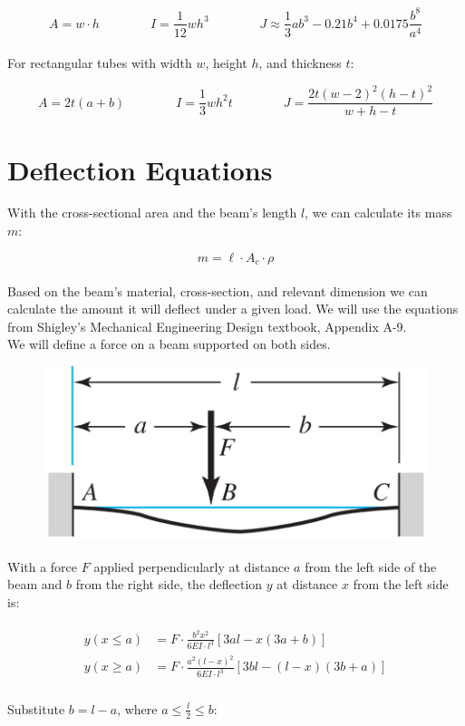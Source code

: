 \documentclass[a4paper]{article}
\begin{document}
	\begin{equation}
		A = w \cdot h \qquad\qquad
		I = \frac{1}{12} w h^3 \qquad\qquad
		J \approx \frac{1}{3} a b^3 - 0.21 b^4 + 0.0175 \frac{b^8}{a^4}
	\end{equation}
	\\
	For rectangular tubes with width $ w $, height $ h $, and thickness $ t $:
	
	\begin{equation}
		A = 2t(a+b) \qquad\qquad
		I = \frac{1}{3} w h^2 t \qquad\qquad
		J = \frac{2t (w-2)^2 (h-t)^2}{w + h - t}
	\end{equation}
	
	
	\section*{Deflection Equations}
	
	With the cross-sectional area and the beam's length $ l $, we can calculate its mass $ m $:
	
	\begin{equation}
		m = \ell \cdot A_c \cdot \rho
	\end{equation}
	\\
	Based on the beam's material, cross-section, and relevant dimension we can calculate the amount it will deflect under a given load. We will use the equations from Shigley's Mechanical Engineering Design textbook, Appendix A-9.\\
	
	\newpage
	We will define a force on a beam supported on both sides.
	
	\begin{figure}[H]
		\centering
		\includegraphics[width=0.7\linewidth]{../img/docs_beambend_btwn}
	\end{figure}
	
	With a force $ F $ applied perpendicularly at distance $ a $ from the left side of the beam and $ b $ from the right side, the deflection $ y $ at distance $ x $ from the left side is:
	
	\begin{gather}
	\begin{aligned}
		y\left( x \leq a \right) &= F \cdot \frac{b^2 x^2}{6 EI \cdot l^3} \left[ 3a l - x \left( 3a+b \right) \right] \\
		y\left( x \geq a \right) &= F \cdot \frac{a^2 \left( l - x \right)^2}{6 EI \cdot l^3} \left[ 3b l - \left( l - x \right) \left( 3b+a \right) \right]
	\end{aligned}
	\end{gather}
	\\
	Substitute $ b = l - a $, where $ a \leq \frac{l}{2} \leq b $:
	
\end{document}
